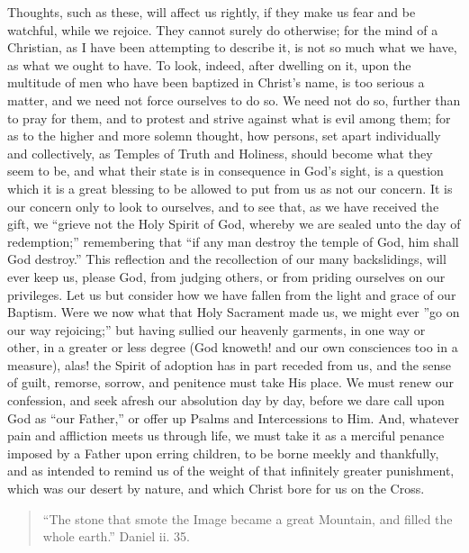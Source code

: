 Thoughts, such as these, will affect us rightly, if they make us fear
and be watchful, while we rejoice. They cannot surely do otherwise; for
the mind of a Christian, as I have been attempting to describe it, is
not so much what we have, as what we ought to have. To look, indeed,
after dwelling on it, upon the multitude of men who have been baptized
in Christ's name, is too serious a matter, and we need not force
ourselves to do so. We need not do so, further than to pray for them,
and to protest and strive against what is evil among them; for as to the
higher and more solemn thought, how persons, set apart individually and
collectively, as Temples of Truth and Holiness, should become what they
seem to be, and what their state is in consequence in God's sight, is a
question which it is a great blessing to be allowed to put from us as
not our concern. It is our concern only to look to ourselves, and to see
that, as we have received the gift, we ``grieve not the Holy Spirit
of God, whereby we are sealed unto the day of redemption;''
remembering that ``if any man destroy the temple of God, him shall
God destroy.'' This reflection and the recollection of our many
backslidings, will ever keep us, please God, from judging others, or
from priding ourselves on our privileges. Let us but consider how we
have fallen from the light and grace of our Baptism. Were we now what
that Holy Sacrament made us, we might ever ''go on our way
rejoicing;'' but having sullied our heavenly garments, in one way or
other, in a greater or less degree (God knoweth! and our own consciences
too in a measure), alas! the Spirit of adoption has in part receded from
us, and the sense of guilt, remorse, sorrow, and penitence must take His
place. We must renew our confession, and seek afresh our absolution day
by day, before we dare call upon God as ``our Father,'' or offer
up Psalms and Intercessions to Him. And, whatever pain and affliction
meets us through life, we must take it as a merciful penance imposed by
a Father upon erring children, to be borne meekly and thankfully, and as
intended to remind us of the weight of that infinitely greater
punishment, which was our desert by nature, and which Christ bore for us
on the Cross.


\begin{quote}

``The stone that smote the Image became a great Mountain, and
filled the whole earth.'' Daniel ii. 35.

\end{quote}

